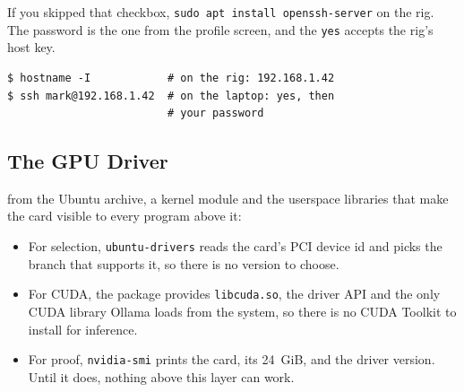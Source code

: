 
 If you skipped that checkbox,
\texttt{sudo apt install openssh-server} on the rig. The password is the one from
the profile screen, and the \texttt{yes} accepts the rig's host key.


\begin{verbatim}
$ hostname -I            # on the rig: 192.168.1.42
$ ssh mark@192.168.1.42  # on the laptop: yes, then
                         # your password
\end{verbatim}













\clearpage

\subsection{The GPU Driver}

 from the Ubuntu archive, a kernel
module and the userspace libraries that make the card visible to every program
above it\cite{ubuntuNvidiaDrivers}:

\begin{itemize}[topsep=0.25em, itemsep=0.4em, parsep=0em]
    \item For selection, \texttt{ubuntu-drivers} reads the card's PCI device id
    and picks the branch that supports it, so there is no version to choose.
    \item For CUDA, the package provides \texttt{libcuda.so}, the driver API and
    the only CUDA library Ollama loads from the system, so there is no CUDA
    Toolkit to install for inference.
    \item For proof, \texttt{nvidia-smi} prints the card, its 24~GiB, and the
    driver version. Until it does, nothing above this layer can work.
\end{itemize}

